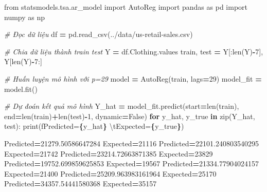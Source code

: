 \documentclass[
]{book}
\newenvironment{Shaded}{\begin{snugshade}}{\end{snugshade}}
\newcommand{\BuiltInTok}[1]{#1}
\newcommand{\CharTok}[1]{\textcolor[rgb]{0.31,0.60,0.02}{#1}}
\newcommand{\CommentTok}[1]{\textcolor[rgb]{0.56,0.35,0.01}{\textit{#1}}}
\newcommand{\ControlFlowTok}[1]{\textcolor[rgb]{0.13,0.29,0.53}{\textbf{#1}}}
\newcommand{\DecValTok}[1]{\textcolor[rgb]{0.00,0.00,0.81}{#1}}
\newcommand{\FloatTok}[1]{\textcolor[rgb]{0.00,0.00,0.81}{#1}}
\newcommand{\ImportTok}[1]{#1}
\newcommand{\KeywordTok}[1]{\textcolor[rgb]{0.13,0.29,0.53}{\textbf{#1}}}
\newcommand{\NormalTok}[1]{#1}
\newcommand{\OperatorTok}[1]{\textcolor[rgb]{0.81,0.36,0.00}{\textbf{#1}}}
\newcommand{\SpecialCharTok}[1]{\textcolor[rgb]{0.81,0.36,0.00}{\textbf{#1}}}
\newcommand{\SpecialStringTok}[1]{\textcolor[rgb]{0.31,0.60,0.02}{#1}}
\newcommand{\StringTok}[1]{\textcolor[rgb]{0.31,0.60,0.02}{#1}}
\newcommand{\VariableTok}[1]{\textcolor[rgb]{0.00,0.00,0.00}{#1}}
\begin{document}
\begin{Shaded}
\begin{Highlighting}[]

\ImportTok{from}\NormalTok{ statsmodels.tsa.ar\_model }\ImportTok{import}\NormalTok{ AutoReg}
\ImportTok{import}\NormalTok{ pandas }\ImportTok{as}\NormalTok{ pd }
\ImportTok{import}\NormalTok{ numpy }\ImportTok{as}\NormalTok{ np}

\CommentTok{\# Đọc dữ liệu}
\NormalTok{df }\OperatorTok{=}\NormalTok{ pd.read\_csv(}\StringTok{\textquotesingle{}../data/us{-}retail{-}sales.csv\textquotesingle{}}\NormalTok{)}

\CommentTok{\# Chia dữ liệu thành train test}
\NormalTok{Y }\OperatorTok{=}\NormalTok{ df.Clothing.values}
\NormalTok{train, test }\OperatorTok{=}\NormalTok{ Y[:}\BuiltInTok{len}\NormalTok{(Y)}\OperatorTok{{-}}\DecValTok{7}\NormalTok{], Y[}\BuiltInTok{len}\NormalTok{(Y)}\OperatorTok{{-}}\DecValTok{7}\NormalTok{:]}

\CommentTok{\# Huấn luyện mô hình với p=29}
\NormalTok{model }\OperatorTok{=}\NormalTok{ AutoReg(train, lags}\OperatorTok{=}\DecValTok{29}\NormalTok{)}
\NormalTok{model\_fit }\OperatorTok{=}\NormalTok{ model.fit()}

\CommentTok{\# Dự đoán kết quả mô hình}
\NormalTok{Y\_hat }\OperatorTok{=}\NormalTok{ model\_fit.predict(start}\OperatorTok{=}\BuiltInTok{len}\NormalTok{(train), end}\OperatorTok{=}\BuiltInTok{len}\NormalTok{(train)}\OperatorTok{+}\BuiltInTok{len}\NormalTok{(test)}\OperatorTok{{-}}\DecValTok{1}\NormalTok{, dynamic}\OperatorTok{=}\VariableTok{False}\NormalTok{)}
\ControlFlowTok{for}\NormalTok{ y\_hat, y\_true }\KeywordTok{in} \BuiltInTok{zip}\NormalTok{(Y\_hat, test):}
    \BuiltInTok{print}\NormalTok{(}\SpecialStringTok{f\textquotesingle{}Predicted=}\SpecialCharTok{\{}\NormalTok{y\_hat}\SpecialCharTok{\}}\SpecialStringTok{ }\CharTok{\textbackslash{}t}\SpecialStringTok{Expected=}\SpecialCharTok{\{}\NormalTok{y\_true}\SpecialCharTok{\}}\SpecialStringTok{\textquotesingle{}}\NormalTok{)}
\end{Highlighting}
\end{Shaded}

\begin{Shaded}
\begin{Highlighting}[]
\NormalTok{Predicted}\OperatorTok{=}\FloatTok{21279.50586647284}\NormalTok{     Expected}\OperatorTok{=}\DecValTok{21116}
\NormalTok{Predicted}\OperatorTok{=}\FloatTok{22101.240803540295}\NormalTok{    Expected}\OperatorTok{=}\DecValTok{21742}
\NormalTok{Predicted}\OperatorTok{=}\FloatTok{23214.72663871385}\NormalTok{     Expected}\OperatorTok{=}\DecValTok{23829}
\NormalTok{Predicted}\OperatorTok{=}\FloatTok{19752.699859625853}\NormalTok{    Expected}\OperatorTok{=}\DecValTok{19567}
\NormalTok{Predicted}\OperatorTok{=}\FloatTok{21334.77904024157}\NormalTok{     Expected}\OperatorTok{=}\DecValTok{21400}
\NormalTok{Predicted}\OperatorTok{=}\FloatTok{25209.963983161964}\NormalTok{    Expected}\OperatorTok{=}\DecValTok{25170}
\NormalTok{Predicted}\OperatorTok{=}\FloatTok{34357.54441580368}\NormalTok{     Expected}\OperatorTok{=}\DecValTok{35157}
\end{Highlighting}
\end{Shaded}
\end{document}
